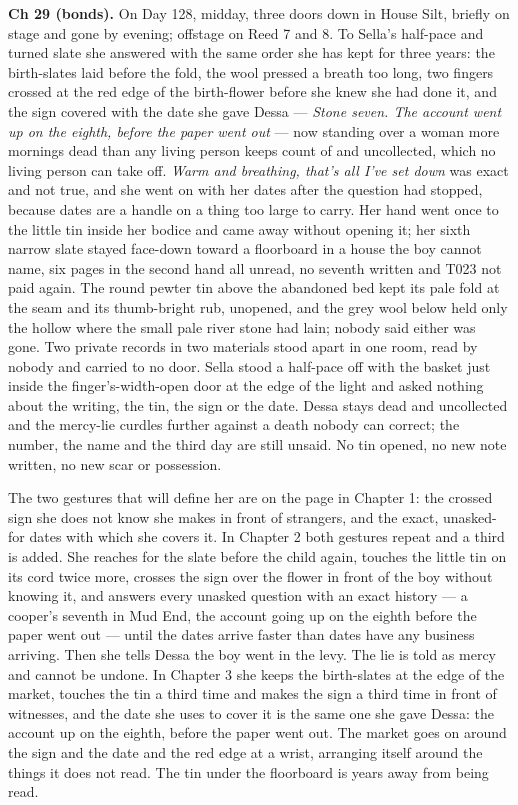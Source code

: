 \documentclass{design/chronicle}
\begin{document}
{\textbf{Ch 29 (bonds).} On Day 128, midday, three doors down in House Silt, briefly on stage and gone by evening; offstage on Reed 7 and 8. To Sella’s half-pace and turned slate she answered with the same order she has kept for three years: the birth-slates laid before the fold, the wool pressed a breath too long, two fingers crossed at the red edge of the birth-flower before she knew she had done it, and the sign covered with the date she gave Dessa — \emph{Stone seven. The account went up on the eighth, before the paper went out} — now standing over a woman more mornings dead than any living person keeps count of and uncollected, which no living person can take off. \emph{Warm and breathing, that’s all I’ve set down} was exact and not true, and she went on with her dates after the question had stopped, because dates are a handle on a thing too large to carry. Her hand went once to the little tin inside her bodice and came away without opening it; her sixth narrow slate stayed face-down toward a floorboard in a house the boy cannot name, six pages in the second hand all unread, no seventh written and T023 not paid again. The round pewter tin above the abandoned bed kept its pale fold at the seam and its thumb-bright rub, unopened, and the grey wool below held only the hollow where the small pale river stone had lain; nobody said either was gone. Two private records in two materials stood apart in one room, read by nobody and carried to no door. Sella stood a half-pace off with the basket just inside the finger’s-width-open door at the edge of the light and asked nothing about the writing, the tin, the sign or the date. Dessa stays dead and uncollected and the mercy-lie curdles further against a death nobody can correct; the number, the name and the third day are still unsaid. No tin opened, no new note written, no new scar or possession.

The two gestures that will define her are on the page in Chapter 1: the crossed sign she does not know she makes in front of strangers, and the exact, unasked-for dates with which she covers it. In Chapter 2 both gestures repeat and a third is added. She reaches for the slate before the child again, touches the little tin on its cord twice more, crosses the sign over the flower in front of the boy without knowing it, and answers every unasked question with an exact history --- a cooper’s seventh in Mud End, the account going up on the eighth before the paper went out --- until the dates arrive faster than dates have any business arriving. Then she tells Dessa the boy went in the levy. The lie is told as mercy and cannot be undone. In Chapter 3 she keeps the birth-slates at the edge of the market, touches the tin a third time and makes the sign a third time in front of witnesses, and the date she uses to cover it is the same one she gave Dessa: the account up on the eighth, before the paper went out. The market goes on around the sign and the date and the red edge at a wrist, arranging itself around the things it does not read. The tin under the floorboard is years away from being read.

}
\end{document}
